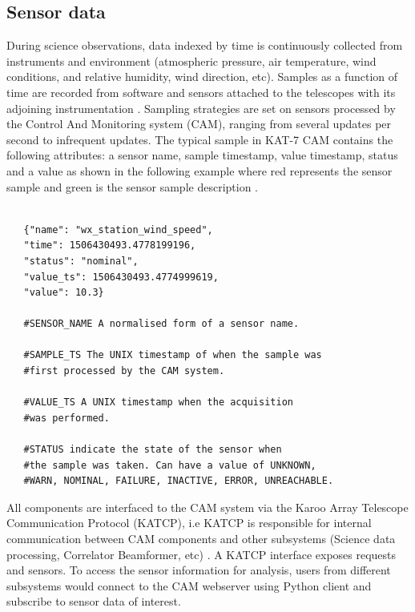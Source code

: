 \subsection{Sensor data}


During science observations, data indexed by time is continuously collected from instruments and  environment (atmospheric pressure, air temperature,  wind conditions, and relative humidity, wind direction, etc). Samples as a function of time are recorded from software and sensors attached to the telescopes with its adjoining instrumentation \citep{slabberICALEPCS2017}. Sampling strategies are set on sensors processed by the Control And Monitoring system (CAM), ranging from several updates per second to infrequent updates. The typical sample in KAT-7 CAM contains the following attributes: a sensor name, sample timestamp, value timestamp, status and a value as shown in the following example where red represents the sensor sample and green is the sensor sample description  \citep{slabber2015overview, slabber2015illustrate}. 

 

\begin{tcolorbox} 
\begin{lstlisting}

   {"name": "wx_station_wind_speed",
   "time": 1506430493.4778199196,
   "status": "nominal",
   "value_ts": 1506430493.4774999619,
   "value": 10.3}

   #SENSOR_NAME A normalised form of a sensor name.

   #SAMPLE_TS The UNIX timestamp of when the sample was
   #first processed by the CAM system.

   #VALUE_TS A UNIX timestamp when the acquisition
   #was performed. 

   #STATUS indicate the state of the sensor when
   #the sample was taken. Can have a value of UNKNOWN,
   #WARN, NOMINAL, FAILURE, INACTIVE, ERROR, UNREACHABLE. 
\end{lstlisting}
\end{tcolorbox}

All components are interfaced to the CAM system via the Karoo Array Telescope Communication Protocol (KATCP), i.e KATCP is responsible for internal communication between CAM components and other subsystems (Science data processing, Correlator Beamformer, etc) \citep{slabber2015overview}. A KATCP interface exposes requests and sensors. To access the sensor information for analysis, users from different subsystems  would  connect to the CAM webserver using Python client and subscribe to sensor data of interest. 

